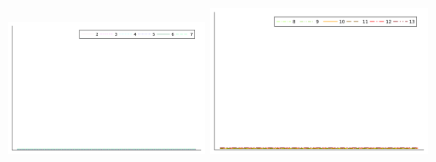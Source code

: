 \begin{figure}
	\centering
 	\includegraphics[width=0.465\textwidth,trim={215 340 33 22}, clip]{pdf/odepics/colors_a-d_new_horiz_2-7_no_order.pdf}\!\!
	\includegraphics[width=0.515\textwidth,trim={179 340 30 22}, clip]{pdf/odepics/colors_a-d_new_horiz_8-13_no_order.pdf}\\


\end{figure}
